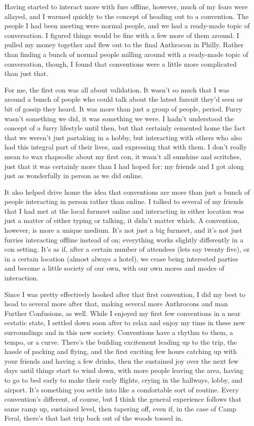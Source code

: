 Having started to interact more with furs offline, however, much of my fears were allayed, and I warmed quickly to the concept of heading out to a convention. The people I had been meeting were normal people, and we had a ready-made topic of conversation. I figured things would be fine with a few more of them around. I pulled my money together and flew out to the final Anthrocon in Philly. Rather than finding a bunch of normal people milling around with a ready-made topic of conversation, though, I found that conventions were a little more complicated than just that.

For me, the first con was all about validation. It wasn't so much that I was around a bunch of people who could talk about the latest fursuit they'd seen or bit of gossip they heard. It was more than just a group of people, period. Furry wasn't something we did, it was something we were. I hadn't understood the concept of a furry lifestyle until then, but that certainly cemented home the fact that we weren't just partaking in a hobby, but interacting with others who also had this integral part of their lives, and expressing that with them. I don't really mean to wax rhapsodic about my first con, it wasn't all sunshine and scritches, just that it was certainly more than I had hoped for: my friends and I got along just as wonderfully in person as we did online.

It also helped drive home the idea that conventions are more than just a bunch of people interacting in person rather than online. I talked to several of my friends that I had met at the local furmeet online and interacting in either location was just a matter of either typing or talking, it didn't matter which. A convention, however, is more a unique medium. It's not just a big furmeet, and it's not just furries interacting offline instead of on; everything works slightly differently in a con setting. It's as if, after a certain number of attendees (lets say twenty five), or in a certain location (almost always a hotel), we cease being interested parties and become a little society of our own, with our own mores and modes of interaction.

Since I was pretty effectively hooked after that first convention, I did my best to head to several more after that, making several more Anthrocons and man Further Confusions, as well. While I enjoyed my first few conventions in a near ecstatic state, I settled down soon after to relax and enjoy my time in these new surroundings and in this new society. Conventions have a rhythm to them, a tempo, or a curve. There's the building excitement leading up to the trip, the hassle of packing and flying, and the first exciting few hours catching up with your friends and having a few drinks, then the sustained joy over the next few days until things start to wind down, with more people leaving the area, having to go to bed early to make their early flights, crying in the hallways, lobby, and airport. It's something you settle into like a comfortable sort of routine. Every convention's different, of course, but I think the general experience follows that same ramp up, sustained level, then tapering off, even if, in the case of Camp Feral, there's that last trip back out of the woods tossed in.

